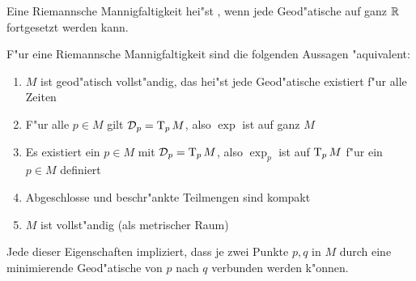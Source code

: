 \begin{Dfn}
Eine Riemannsche Mannigfaltigkeit hei"st , wenn jede Geod"atische auf ganz $\operatorname{\mathbb{R}}$ fortgesetzt werden kann.
\end{Dfn}

\begin{Satz}
F"ur eine Riemannsche Mannigfaltigkeit sind die folgenden Aussagen "aquivalent:
\begin{enumerate}[label=(\roman*),widest=iii]
\item
	$M$ ist geod"atisch vollst"andig, das hei"st jede Geod"atische existiert f"ur alle Zeiten
\item
	F"ur alle $p \in M$ gilt $\operatorname{\mathcal{D}}_p = \operatorname{T}_pM$, also $\exp$ ist auf ganz $M$
\item
	Es existiert ein $p \in M$ mit $\operatorname{\mathcal{D}}_p = \operatorname{T}_pM$, also $\exp_p$ ist auf $\operatorname{T}_pM$ f"ur ein $p \in M$ definiert
\item
	Abgeschlosse und beschr"ankte Teilmengen sind kompakt
\item
	$M$ ist vollst"andig (als metrischer Raum)
\end{enumerate}
Jede dieser Eigenschaften impliziert, dass je zwei Punkte $p, q$ in $M$ durch eine minimierende Geod"atische von $p$ nach $q$ verbunden werden k"onnen.
\end{Satz}

